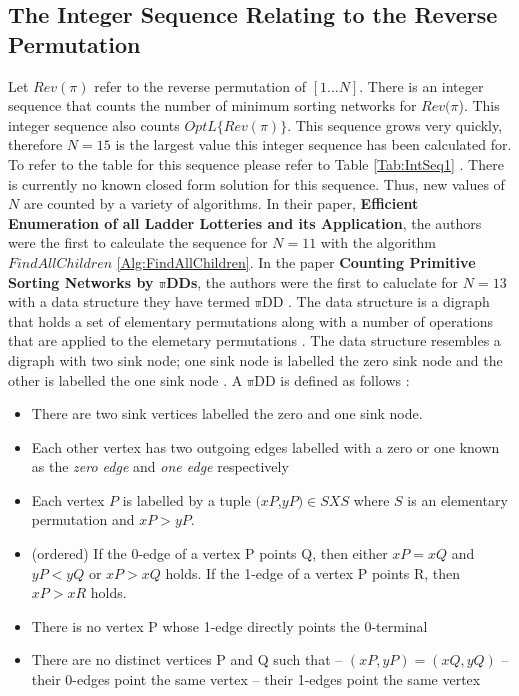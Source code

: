 \subsection{The Integer Sequence Relating to the Reverse Permutation}
Let $Rev(\pi)$ refer to the reverse permutation of $[1 \dots N]$. There is an integer sequence that counts the number of minimum sorting networks 
for $Rev(\pi$). This integer sequence also counts $OptL\{Rev(\pi)\}$. This sequence grows very quickly, therefore $N=15$ 
is  the largest value this integer sequence has been calculated for. To refer to the table for this sequence 
please refer to Table \ref{Tab:IntSeq1} \cite{A30}.
There is currently no known closed form solution for this sequence. 
Thus, new values of $N$ are counted by a variety of algorithms. 
In their paper, \textbf{Efficient Enumeration of all Ladder Lotteries and its Application}, 
the authors were the first to calculate the sequence for $N=11$ \cite{A1} with the algorithm $FindAllChildren$ \ref{Alg:FindAllChildren}. 
In the paper \textbf{Counting Primitive Sorting Networks by $\mathbb{\pi}$DDs}, the authors were the first to caluclate for 
$N=13$ with a data structure they have termed $\mathbb{\pi}$DD \cite{A29}. The data structure is a digraph that holds a 
set of elementary permutations along with a number of operations that are applied to the elemetary permutations \cite{A29}.
The data structure resembles a digraph with two sink node; one sink node is labelled the zero sink node and the other 
is labelled the one sink node \cite{A29}. A $\mathbb{\pi}$DD is defined as follows \cite{A29}: 
\begin{itemize}
    \item There are two sink vertices labelled the zero and one sink node.
    \item Each other vertex has two outgoing edges labelled with a zero or one known as the \emph{zero edge} and \emph{one edge} respectively
    \item Each vertex $P$ is labelled by a tuple $(xP$,$yP) \in S X S$ where $S$ is an elementary permutation and $xP > yP$. 
    \item  (ordered) If the 0-edge of a vertex P points Q, then either $xP = xQ$ and
            $yP < yQ$ or $xP > xQ$ holds. If the 1-edge of a vertex P points R, then
            $xP > xR$ holds.
    \item There is no vertex P whose 1-edge directly points the 0-terminal
    \item There are no distinct vertices P and Q such that
        – $(xP, yP) = (xQ, yQ)$\newline
        – their 0-edges point the same vertex\newline
        – their 1-edges point the same vertex\newline
\end{itemize}

